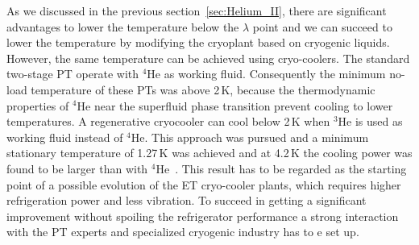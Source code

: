As we discussed in the previous section~\ref{sec:Helium_II}, there are significant advantages to lower the temperature below the $\lambda$ point and we can succeed to lower the temperature by modifying  the cryoplant based on cryogenic liquids. However, the same temperature can be achieved using cryo-coolers.  The standard two-stage PT  operate with ${}^4$He as working fluid. Consequently the minimum no-load temperature of these PTs was above 2\,K, because the thermodynamic properties of ${}^4$He near the superfluid phase transition prevent cooling to lower temperatures. A regenerative cryocooler can cool below 2\,K when ${}^3$He is used as working fluid instead of ${}^4$He. This approach was pursued and  a minimum stationary temperature of 1.27\,K  was achieved and  at 4.2\,K  the cooling power  was found to be larger than with ${}^4$He~\cite{Thummes}. This result has to be regarded as the starting point of a possible evolution of the ET cryo-cooler plants, which requires higher refrigeration power and less vibration.
 To succeed in getting a significant improvement without spoiling the refrigerator performance a strong interaction with the PT experts and specialized cryogenic industry has to e set up.

















